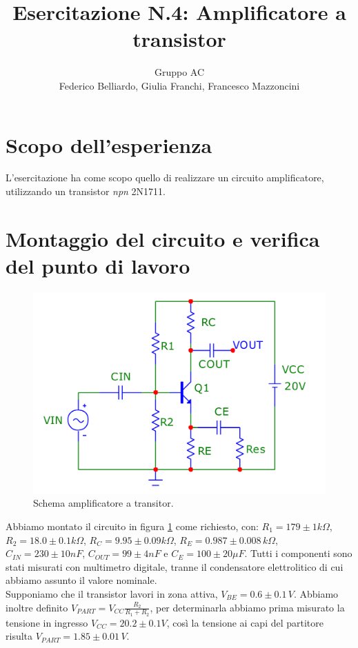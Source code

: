 \documentclass[10pt,a4paper]{article}
\author{Gruppo AC \\ Federico Belliardo, Giulia Franchi, Francesco Mazzoncini}
\title{Esercitazione N.4: Amplificatore a transistor}
\begin{document}
\maketitle

\section{Scopo dell'esperienza}
L'esercitazione ha come scopo quello di realizzare un circuito amplificatore, utilizzando un transistor \textit{npn} 2N1711.

\section{Montaggio del circuito e verifica del punto di lavoro}

\begin{figure}[!htb]
  \centering
  \includegraphics[scale=0.3]{circuito1.png}
\caption{Schema amplificatore a transitor.}
\label{circuito}
\end{figure}

Abbiamo montato il circuito in figura \ref{circuito} come richiesto, con: $R_1= 179\pm1  k\Omega$, $R_2= 18.0\pm0.1  k\Omega$, $R_C= 9.95\pm 0.09  k\Omega$, $R_E= 0.987\pm 0.008 \, k\Omega$, $C_{IN}= 230\pm10  nF$, $C_{OUT}= 99\pm4  nF$ e $C_E= 100\pm20  \mu F$. Tutti i componenti sono stati misurati con multimetro digitale, tranne il condensatore elettrolitico di cui abbiamo assunto il valore nominale.\\
Supponiamo che il transistor lavori in zona attiva, $V_{BE} = 0.6 \pm 0.1 \, V$. Abbiamo inoltre definito $V_{PART}=V_{CC}\frac{R_2}{R_1+R_2}$, per determinarla abbiamo prima misurato la tensione in ingresso $V_{CC}= 20.2\pm0.1 V$, così la tensione ai capi del partitore risulta $V_{PART}=1.85 \pm 0.01\,V$.
\end{document}
